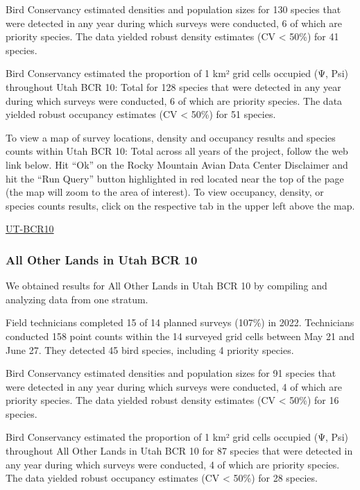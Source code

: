 \documentclass[
  letterpaper,
  DIV=11,
  numbers=noendperiod,
  oneside]{scrreprt}
\begin{document}
Bird Conservancy estimated densities and population sizes for 130
species that were detected in any year during which surveys were
conducted, 6 of which are priority species. The data yielded robust
density estimates (CV \textless{} 50\%) for 41 species.

Bird Conservancy estimated the proportion of 1 km² grid cells occupied
(Ψ, Psi) throughout Utah BCR 10: Total for 128 species that were
detected in any year during which surveys were conducted, 6 of which are
priority species. The data yielded robust occupancy estimates (CV
\textless{} 50\%) for 51 species.

To view a map of survey locations, density and occupancy results and
species counts within Utah BCR 10: Total across all years of the
project, follow the web link below. Hit ``Ok'' on the Rocky Mountain
Avian Data Center Disclaimer and hit the ``Run Query'' button
highlighted in red located near the top of the page (the map will zoom
to the area of interest). To view occupancy, density, or species counts
results, click on the respective tab in the upper left above the map.

\href{http://www.rmbo.org/new_site/adc/QueryWindow.aspx\#N4IgzgrgDgpgTmALnAhoiBbEAuABCAVQBUBaAIQGEAlARgAYQBfIA===}{UT-BCR10}

\hypertarget{all-other-lands-in-utah-bcr-10}{%
\subsubsection{All Other Lands in Utah BCR
10}\label{all-other-lands-in-utah-bcr-10}}

We obtained results for All Other Lands in Utah BCR 10 by compiling and
analyzing data from one stratum.

Field technicians completed 15 of 14 planned surveys (107\%) in 2022.
Technicians conducted 158 point counts within the 14 surveyed grid cells
between May 21 and June 27. They detected 45 bird species, including 4
priority species.

Bird Conservancy estimated densities and population sizes for 91 species
that were detected in any year during which surveys were conducted, 4 of
which are priority species. The data yielded robust density estimates
(CV \textless{} 50\%) for 16 species.

Bird Conservancy estimated the proportion of 1 km² grid cells occupied
(Ψ, Psi) throughout All Other Lands in Utah BCR 10 for 87 species that
were detected in any year during which surveys were conducted, 4 of
which are priority species. The data yielded robust occupancy estimates
(CV \textless{} 50\%) for 28 species.
\end{document}
